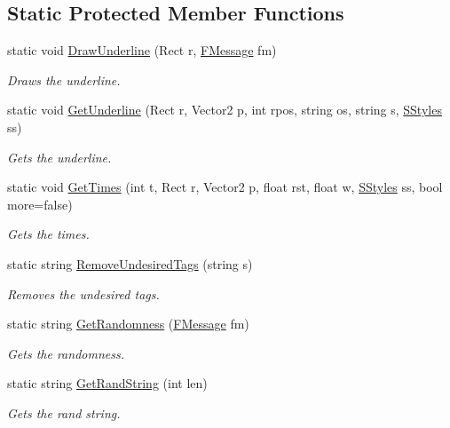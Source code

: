 \subsection*{Static Protected Member Functions}
\begin{DoxyCompactItemize}
\item 
static void \hyperlink{class_lerp2_a_p_i_1_1_game_1_1_game_console_a84e2cf57f5ee57c0a042acf4f518aaca}{Draw\+Underline} (Rect r, \hyperlink{class_lerp2_a_p_i_1_1_game_1_1_game_console_1_1_f_message}{F\+Message} fm)
\begin{DoxyCompactList}\small\item\em Draws the underline. \end{DoxyCompactList}\item 
static void \hyperlink{class_lerp2_a_p_i_1_1_game_1_1_game_console_a245885636c5511d933447fe974e92ee0}{Get\+Underline} (Rect r, Vector2 p, int rpos, string os, string s, \hyperlink{namespace_lerp2_a_p_i_1_1_game_a40a896b145d802bb883b777ab7413d7b}{S\+Styles} ss)
\begin{DoxyCompactList}\small\item\em Gets the underline. \end{DoxyCompactList}\item 
static void \hyperlink{class_lerp2_a_p_i_1_1_game_1_1_game_console_a75599c8ffeadc3a8e3d6de281cb423f8}{Get\+Times} (int t, Rect r, Vector2 p, float rst, float w, \hyperlink{namespace_lerp2_a_p_i_1_1_game_a40a896b145d802bb883b777ab7413d7b}{S\+Styles} ss, bool more=false)
\begin{DoxyCompactList}\small\item\em Gets the times. \end{DoxyCompactList}\item 
static string \hyperlink{class_lerp2_a_p_i_1_1_game_1_1_game_console_a56a8eb8fafe2c8a5d23f472e52d286d1}{Remove\+Undesired\+Tags} (string s)
\begin{DoxyCompactList}\small\item\em Removes the undesired tags. \end{DoxyCompactList}\item 
static string \hyperlink{class_lerp2_a_p_i_1_1_game_1_1_game_console_ad5a542bb0dcc8d1ffd261456daeaf1c8}{Get\+Randomness} (\hyperlink{class_lerp2_a_p_i_1_1_game_1_1_game_console_1_1_f_message}{F\+Message} fm)
\begin{DoxyCompactList}\small\item\em Gets the randomness. \end{DoxyCompactList}\item 
static string \hyperlink{class_lerp2_a_p_i_1_1_game_1_1_game_console_a1f9e983b12a68fd8112d955cf952ae08}{Get\+Rand\+String} (int len)
\begin{DoxyCompactList}\small\item\em Gets the rand string. \end{DoxyCompactList}\end{DoxyCompactItemize}
